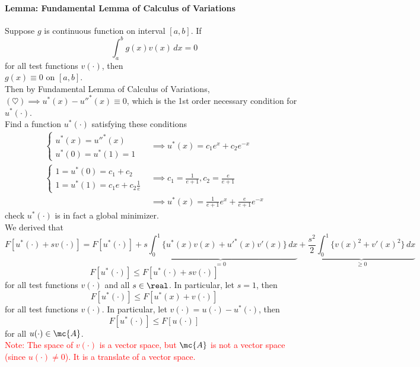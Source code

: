 \documentclass[11pt]{article}
\begin{document}
\paragraph{Lemma: Fundamental Lemma of Calculus of Variations}
Suppose $g$ is continuous function on interval $[a,b]$. If
$$\int_a^b g(x)v(x) \, dx = 0$$ for all test functions $v(\cdot)$, then \\
$g(x) \equiv 0$ on $[a,b]$.\\
Then by Fundamental Lemma of Calculus of Variations, $(\heartsuit) \implies u^*(x) - u''^{*}(x) \equiv 0$, which is the 1st order necessary condition for $u^*(\cdot)$. \\
 Find a function $u^*(\cdot)$ satisfying these conditions
\begin{align}
\begin{cases}
	u^*(x) = u''^{*}(x) \\
	u^*(0) = u^*(1) = 1
\end{cases} &\implies u^*(x) = c_1e^x + c_2e^{-x} \\
\begin{cases}
	1 = u^*(0) = c_1 + c_2 \\
	1 = u^*(1) = c_1e + c_2 \frac{1}{e}
\end{cases} &\implies c_1 = \frac{1}{e + 1}, c_2 = \frac{e}{e+1} \\
&\implies u^*(x) = \frac{1}{e + 1} e^x + \frac{e}{e+1}e^{-x}
\end{align}
 check $u^*(\cdot)$ is in fact a global minimizer. \\
We derived that 
$$F[u^*(\cdot) + sv(\cdot)] = F[u^*(\cdot)] + \underbrace{s\int_0^1 \{ u^*(x)v(x) + u'^{*}(x)v'(x)\} \, dx}_{=0} + \underbrace{\frac{s^2}{2} \int_0^1 \{ v(x)^2 + v'(x)^2 \} \, dx}_{\geq 0}$$
$$F[u^*(\cdot)] \leq F[u^*(\cdot) + sv(\cdot)]$$
for all test functions $v(\cdot)$ and all $s \in \real$. In particular, let $s = 1$, then\\
$$F[u^*(\cdot)] \leq F[u^*(x) + v(\cdot)]$$
for all test functions $v(\cdot)$. In particular, let $v(\cdot) = u(\cdot) - u^*(\cdot)$, then
$$F[u^*(\cdot)] \leq F[u(\cdot)]$$ for all $u(\cdot) \in \mc{A}$. \\
\textcolor{red}{Note: The space of $v(\cdot)$ is a vector space, but $\mc{A}$ is not a vector space (since $u(\cdot) \neq 0$). It is a translate of a vector space.}
\end{document}
